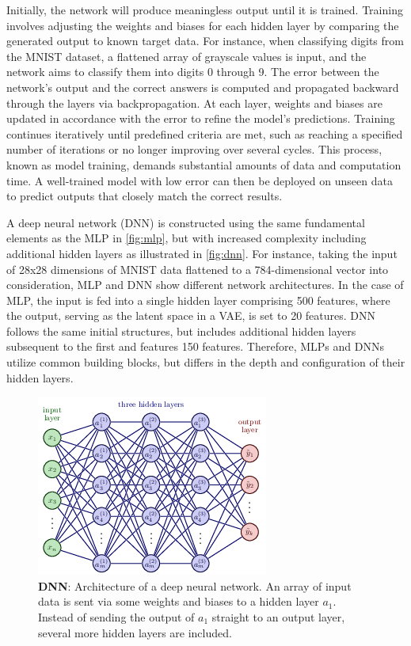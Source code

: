 Initially, the network will produce meaningless output until it is trained. Training involves adjusting the weights and biases for each hidden layer by comparing the generated output to known target data. For instance, when classifying digits from the MNIST dataset, a flattened array of grayscale values is input, and the network aims to classify them into digits 0 through 9. The error between the network's output and the correct answers is computed and propagated backward through the layers via backpropagation. At each layer, weights and biases are updated in accordance with the error to refine the model's predictions. Training continues iteratively until predefined criteria are met, such as reaching a specified number of iterations or no longer improving over several cycles. This process, known as model training, demands substantial amounts of data and computation time. A well-trained model with low error can then be deployed on unseen data to predict outputs that closely match the correct results.

A deep neural network (DNN) is constructed using the same fundamental elements as the MLP in \autoref{fig:mlp}, but with increased complexity including additional hidden layers as illustrated in \autoref{fig:dnn}. For instance, taking the input of 28x28 dimensions of MNIST data flattened to a 784-dimensional vector into consideration, MLP and DNN show different network architectures. In the case of MLP, the input is fed into a single hidden layer comprising 500 features, where the output, serving as the latent space in a VAE, is set to 20 features. DNN follows the same initial structures, but includes additional hidden layers subsequent to the first and features 150 features. Therefore, MLPs and DNNs utilize common building blocks, but differs in the depth and configuration of their hidden layers.

\begin{figure}
    \centering
    \includegraphics[width=0.5\linewidth]{latex//figures/nn1.png}
    \caption{\textbf{DNN}: Architecture of a deep neural network. An array of input data is sent via some weights and biases to a hidden layer $a_1$. Instead of sending the output of $a_1$ straight to an output layer, several more hidden layers are included.}
    \label{fig:dnn}
\end{figure}

